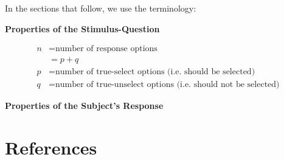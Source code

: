 \documentclass[
  letterpaper,
  DIV=11,
  numbers=noendperiod]{scrreprt}
\newlength{\cslhangindent}
\newlength{\cslentryspacingunit} %
\newenvironment{CSLReferences}[2] %
 {%
  \setlength{\parindent}{0pt}
  \ifodd #1
  \let\oldpar\par
  \def\par{\hangindent=\cslhangindent\oldpar}
  \fi
  \setlength{\parskip}{#2\cslentryspacingunit}
 }%
 {}
\begin{document}
In the sections that follow, we use the terminology:

\textbf{Properties of the Stimulus-Question}

\[
\begin{align}
n &= \text{number of response options} \\  
  &= p + q \\ 
  p &= \text{number of true-select options (i.e. should be selected)} \\
  q &= \text{number of true-unselect options (i.e. should not be selected)} 
\end{align}
\]

\textbf{Properties of the Subject's Response}

\hypertarget{references}{%
\chapter*{References}\label{references}}

\hypertarget{refs}{}
\begin{CSLReferences}{0}{0}
\end{CSLReferences}
\end{document}
